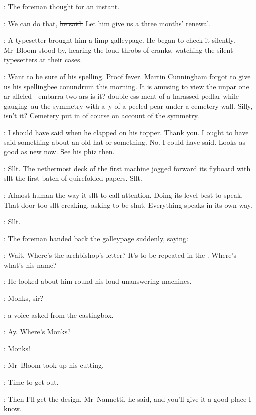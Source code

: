:
The foreman thought for an instant.

\foreman:
We can do that,
\sout{he said.}
Let him give us a three months' renewal.

:
A typesetter brought him a limp galleypage.
He began to check it silently.
Mr~Bloom stood by,
hearing the loud throbs of cranks,
watching the silent typesetters at their cases.



\BloomInt:
Want to be sure of his spelling.
Proof fever.
Martin Cunningham forgot to give us his spellingbee conundrum this morning.
It is amusing to view the
unpar one ar alleled |
embarra two ars is it?
double ess ment of a harassed pedlar
while gauging~au
the symmetry with a~y
of a peeled pear
under a cemetery wall.
Silly, isn't it?
Cemetery put in of course
on account of the symmetry.%

\BloomInt:
I should have said when he clapped on his topper.
Thank you.
I ought to have said something about an old hat or something.
No.
I could have said.
Looks as good as new now.
See his phiz then.

:
Sllt.
The nethermost deck of the first machine
jogged forward its flyboard
with sllt
the first batch of quirefolded papers.
Sllt.

\BloomInt:
Almost human the way it sllt to call attention.
Doing its level best to speak.
That door too sllt creaking, asking to be shut.
Everything speaks in its own way.

:
Sllt.




:
The foreman handed back the galleypage suddenly,
saying:

\foreman:
Wait.
Where's the archbishop's letter?
It's to be repeated in the .
Where's what's his name?

:
He looked about him round his loud unanswering machines.

\voice:
Monks, sir?

:
a voice asked from the castingbox.

\foreman:
Ay.
Where's Monks?

\foreman:
Monks!

:
Mr~Bloom took up his cutting.

\BloomInt:
Time to get out.

\Bloom:
Then I'll get the design, Mr~Nannetti,
\sout{he said,}
and you'll give it a good place I know.

